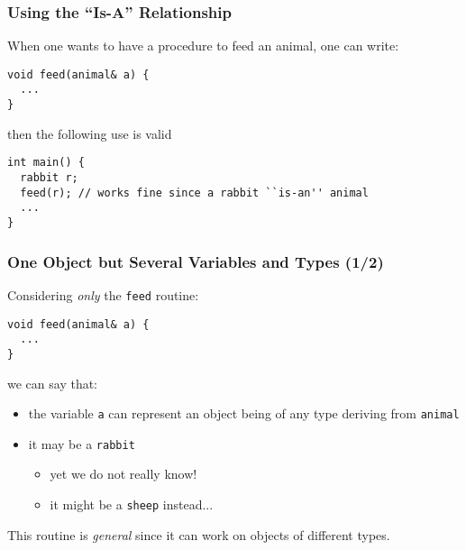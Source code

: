 \documentclass{beamer}
\newcommand{\code}[1]{{\scriptsize{\texttt{#1}}}\xspace}
\begin{document}
\begin{frame}[fragile]
  \frametitle{Using the ``Is-A'' Relationship}

  When one wants to have a procedure to feed an animal, one can write:

\begin{lstlisting}
void feed(animal& a) {
  ...
}
\end{lstlisting}

then the following use is valid 
\begin{lstlisting}
int main() {
  rabbit r;
  feed(r); // works fine since a rabbit ``is-an'' animal
  ...
}
\end{lstlisting}

\end{frame}



\begin{frame}[fragile]
  \frametitle{One Object but Several Variables and Types (1/2)}

Considering \emph{only} the \code{feed} routine:
\begin{lstlisting}
void feed(animal& a) {
  ...
}
\end{lstlisting}

\smallskip

we can say that:
\begin{itemize}
\item the variable \code{a} can represent an object being of any type
  deriving from \code{animal}
\item it may be a \code{rabbit}
  \begin{itemize}
  \item yet we do not really know!
  \item it might be a \code{sheep} instead...
  \end{itemize}
\end{itemize}

\smallskip

\begin{center}
  This routine is \emph{general} since it can work on objects of
  different types.
\end{center}

\end{frame}
\end{document}
